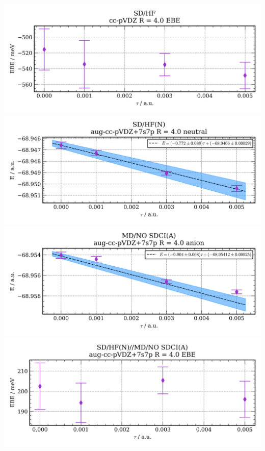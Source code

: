 \includegraphics[width=\textwidth,keepaspectratio]{images/SDshivHF__cc-pvdz__4p0_03_ebe.png}
\includegraphics[width=\textwidth,keepaspectratio]{images/SDshivHFupaNapushivshivMDshivNO_SDCIupaAapu__aug-cc-pvdz+7s7p__4p0_01_neutral.png}
\includegraphics[width=\textwidth,keepaspectratio]{images/SDshivHFupaNapushivshivMDshivNO_SDCIupaAapu__aug-cc-pvdz+7s7p__4p0_02_anion.png}
\includegraphics[width=\textwidth,keepaspectratio]{images/SDshivHFupaNapushivshivMDshivNO_SDCIupaAapu__aug-cc-pvdz+7s7p__4p0_03_ebe.png}
